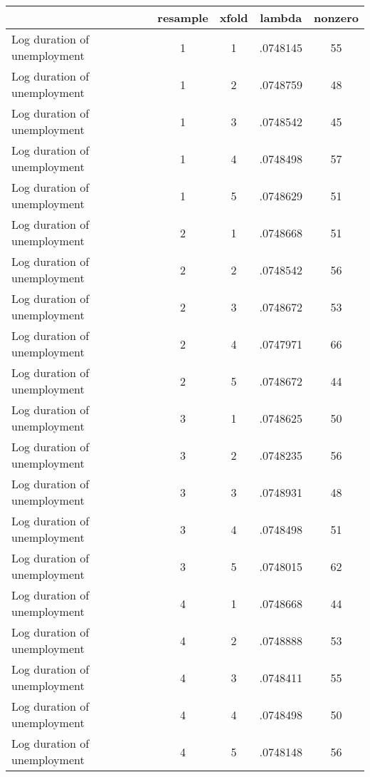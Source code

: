 \begin{tabular}{l*{4}{c}}
\hline\hline
                    &    resample&       xfold&      lambda&     nonzero\\
\hline
Log duration of unemployment&           1&           1&    .0748145&          55\\
Log duration of unemployment&           1&           2&    .0748759&          48\\
Log duration of unemployment&           1&           3&    .0748542&          45\\
Log duration of unemployment&           1&           4&    .0748498&          57\\
Log duration of unemployment&           1&           5&    .0748629&          51\\
Log duration of unemployment&           2&           1&    .0748668&          51\\
Log duration of unemployment&           2&           2&    .0748542&          56\\
Log duration of unemployment&           2&           3&    .0748672&          53\\
Log duration of unemployment&           2&           4&    .0747971&          66\\
Log duration of unemployment&           2&           5&    .0748672&          44\\
Log duration of unemployment&           3&           1&    .0748625&          50\\
Log duration of unemployment&           3&           2&    .0748235&          56\\
Log duration of unemployment&           3&           3&    .0748931&          48\\
Log duration of unemployment&           3&           4&    .0748498&          51\\
Log duration of unemployment&           3&           5&    .0748015&          62\\
Log duration of unemployment&           4&           1&    .0748668&          44\\
Log duration of unemployment&           4&           2&    .0748888&          53\\
Log duration of unemployment&           4&           3&    .0748411&          55\\
Log duration of unemployment&           4&           4&    .0748498&          50\\
Log duration of unemployment&           4&           5&    .0748148&          56\\

\end{tabular}
